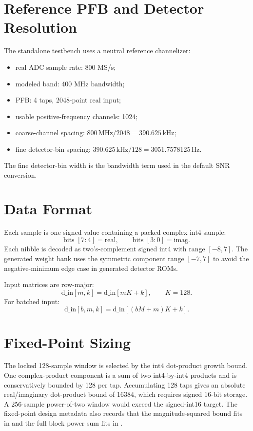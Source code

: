 \documentclass[10pt,letterpaper]{article}
\newcommand{\code}[1]{\texttt{\detokenize{#1}}}
\begin{document}
\section{Reference PFB and Detector Resolution}

The standalone testbench uses a neutral reference channelizer:
\begin{itemize}
  \item real ADC sample rate: 800 MS/s;
  \item modeled band: 400 MHz bandwidth;
  \item PFB: 4 taps, 2048-point real input;
  \item usable positive-frequency channels: 1024;
  \item coarse-channel spacing: \(800\,\mathrm{MHz}/2048=390.625\,\mathrm{kHz}\);
  \item fine detector-bin spacing: \(390.625\,\mathrm{kHz}/128=3051.7578125\,\mathrm{Hz}\).
\end{itemize}
The fine detector-bin width is the bandwidth term used in the default SNR conversion.

\section{Data Format}

Each sample is one signed \code{int8_t} value containing a packed complex int4 sample:
\begin{equation}
  \text{bits }[7:4]=\mathrm{real},\qquad \text{bits }[3:0]=\mathrm{imag}.
\end{equation}
Each nibble is decoded as two's-complement signed int4 with range \([-8,7]\).  The generated weight bank uses the symmetric component range \([-7,7]\) to avoid the negative-minimum edge case in generated detector ROMs.

Input matrices are row-major:
\begin{equation}
  \mathrm{d\_in}[m,k]=\mathrm{d\_in}[mK+k],\qquad K=128.
\end{equation}
For batched input:
\begin{equation}
  \mathrm{d\_in}[b,m,k]=\mathrm{d\_in}[(bM+m)K+k].
\end{equation}

\section{Fixed-Point Sizing}

The locked 128-sample window is selected by the int4 dot-product growth bound.  One complex-product component is a sum of two int4-by-int4 products and is conservatively bounded by 128 per tap.  Accumulating 128 taps gives an absolute real/imaginary dot-product bound of 16384, which requires signed 16-bit storage.  A 256-sample power-of-two window would exceed the signed-int16 target.  The fixed-point design metadata also records that the magnitude-squared bound fits in \code{uint32} and the full block power sum fits in \code{uint64}.
\end{document}
